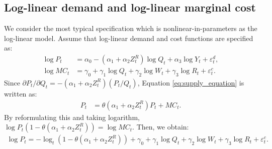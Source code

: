 \documentclass[11pt, a4paper]{article}
\begin{document}
\subsection{Log-linear demand and log-linear marginal cost}
We consider the most typical specification which is nonlinear-in-parameters as the log-linear model.
Assume that log-linear demand and cost functions are specified as:
\begin{align}
    \log P_{t} &= \alpha_0 - (\alpha_1 + \alpha_2 Z^{R}_{t}) \log Q_t + \alpha_3 \log Y_t + \varepsilon^{d}_{t},\label{eq:log_linear_demand}\\
    \log MC_t &= \gamma_0 + \gamma_1 \log Q_t +  \gamma_2 \log W_{t} + \gamma_3 \log R_t + \varepsilon^{c}_{t}.\label{eq:log_linear_marginal_cost}
\end{align}
Since $\partial P_t/\partial Q_t = - (\alpha_1 + \alpha_2 Z_{t}^R) (P_t/Q_t) $, Equation \eqref{eq:supply_equation} is written as:
\begin{align}
    P_t &= \theta (\alpha_1 + \alpha_2 Z^{R}_{t}) P_t + MC_t.\label{eq:log_linear_supply_equation_direct}
\end{align}
By reformulating this and taking logarithm, $\log P_t(1 -\theta (\alpha_1 + \alpha_2 Z^{R}_{t})) = \log MC_t.$
Then, we obtain:
\begin{align}
    \log P_t = - \log_{t}(1 - \theta(\alpha_1 + \alpha_2 Z^{R}_{t})) + \gamma_0 + \gamma_1 \log Q_t +  \gamma_2 \log W_{t} + \gamma_3 \log R_t + \varepsilon^{c}_{t}. \label{eq:log_linear_supply_equation}
\end{align}

\end{document}
